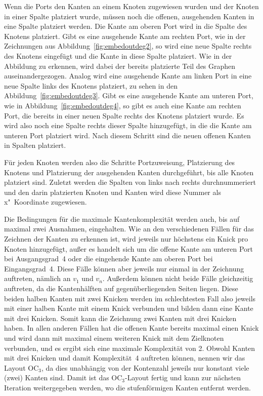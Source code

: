 \documentclass[a4paper]{scrreprt}
\theoremstyle{definition}
\begin{document}
Wenn die Ports den Kanten an einem Knoten zugewiesen wurden und der Knoten in einer Spalte platziert wurde, müssen noch die offenen, ausgehenden Kanten in eine Spalte platziert werden. Die Kante am oberen Port wird in die Spalte des Knotens platziert. Gibt es eine ausgehende Kante am rechten Port, wie in der Zeichnungen aus Abbildung~\ref{fig:embedoutdeg2}, so wird eine neue Spalte rechts des Knotens eingefügt und die Kante in diese Spalte platziert. Wie in der Abbildung zu erkennen, wird dabei der bereits platzierte Teil des Graphen auseinandergezogen. Analog wird eine ausgehende Kante am linken Port in eine neue Spalte links des Knotens platziert, zu sehen in den Abbildung~\ref{fig:embedoutdeg3}. Gibt es eine ausgehende Kante am unteren Port, wie in Abbildung~\ref{fig:embedoutdeg4}, so gibt es auch eine Kante am rechten Port, die bereits in einer neuen Spalte rechts des Knotens platziert wurde. Es wird also noch eine Spalte rechts dieser Spalte hinzugefügt, in die die Kante am unteren Port platziert wird. Nach diesem Schritt sind die neuen offenen Kanten in Spalten platziert.

Für jeden Knoten werden also die Schritte Portzuweisung, Platzierung des Knotens und Platzierung der ausgehenden Kanten durchgeführt, bis alle Knoten platziert sind. Zuletzt werden die Spalten von links nach rechts durchnummeriert und den darin platzierten Knoten und Kanten wird diese Nummer als x"~Koordinate zugewiesen.

Die Bedingungen für die maximale Kantenkomplexität werden auch, bis auf maximal zwei Ausnahmen, eingehalten. Wie an den verschiedenen Fällen für das Zeichnen der Kanten zu erkennen ist, wird jeweils nur höchstens ein Knick pro Knoten hinzugefügt, außer es handelt sich um die offene Kante am unteren Port bei Ausgangsgrad~4 oder die eingehende Kante am oberen Port bei Eingangsgrad~4. Diese Fälle können aber jeweils nur einmal in der Zeichnung auftreten, nämlich an $v_1$ und $v_n$. Außerdem können nicht beide Fälle gleichzeitig auftreten, da die Kantenhälften auf gegenüberliegenden Seiten liegen. Diese beiden halben Kanten mit zwei Knicken werden im schlechtesten Fall also jeweils mit einer halben Kante mit einem Knick verbunden und bilden dann eine Kante mit drei Knicken. Somit kann die Zeichnung zwei Kanten mit drei Knicken haben. In allen anderen Fällen hat die offenen Kante bereits maximal einen Knick und wird dann mit maximal einem weiteren Knick mit dem Zielknoten verbunden, und es ergibt sich eine maximale Komplexität von 2. Obwohl Kanten mit drei Knicken und damit Komplexität~4 auftreten können, nennen wir das Layout OC$_3$, da dies unabhängig von der Kontenzahl jeweils nur konstant viele (zwei) Kanten sind. Damit ist das OC$_3$-Layout fertig und kann zur nächsten Iteration weitergegeben werden, wo die stufenförmigen Kanten entfernt werden.
\end{document}
